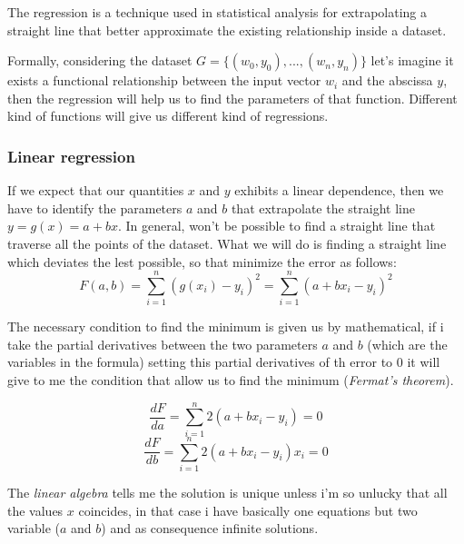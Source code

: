 \documentclass{article}
\begin{document}
The regression is a technique used in statistical analysis for extrapolating a straight
line that better approximate the existing relationship inside a dataset.

Formally, considering the dataset $G=\{(w_0,y_0),...,(w_n,y_n)\}$ let's imagine it exists a functional relationship
between the input vector $w_i$ and the abscissa $y$, then the regression will help us to find
the parameters of that function. Different kind of functions will give us different kind of regressions.

\subsubsection{Linear regression}
If we expect that our quantities $x$ and $y$ exhibits a linear dependence, then we have
to identify the parameters $a$ and $b$ that extrapolate the straight line $y=g(x)=a+bx$.
In general, won't be possible to find a straight line that traverse all the points of the
dataset. What we will do is finding a straight line which deviates the lest possible,
so that minimize the error as follows:
$$F(a,b)=\sum_{i=1}^{n}(g(x_i)-y_i)^2=\sum_{i=1}^n(a+bx_i-y_i)^2$$

The necessary condition to find the minimum is given us by mathematical, if i take the
partial derivatives between the two parameters $a$ and $b$ (which are the variables
in the formula) setting this partial derivatives of th error to $0$ it will give to
me the condition that allow us to find the minimum (\textit{Fermat's theorem}).

$$\frac{dF}{da}=\sum_{i=1}^{n}2(a+bx_i-y_i)=0$$
$$\frac{dF}{db}=\sum_{i=1}^{n}2(a+bx_i-y_i)x_i=0$$

The \textit{linear algebra} tells me the solution is unique unless i'm so unlucky that
all the values $x$ coincides, in that case i have basically one equations but
two variable ($a$ and $b$) and as consequence infinite solutions.
\end{document}
